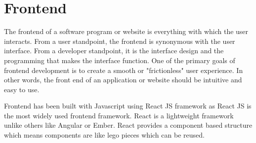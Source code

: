 

\section{Frontend}\label{sec:frontend}
The frontend of a software program or website is everything with which the user interacts.
From a user standpoint, the frontend is synonymous with the user interface.
From a developer standpoint, it is the interface design and the programming that makes the interface function.
One of the primary goals of frontend development is to create a smooth or "frictionless" user experience.
In other words, the front end of an application or website should be intuitive and easy to use.

Frontend has been built with Javascript using React JS framework as React JS is the most widely used frontend framework.
React is a lightweight framework unlike others like Angular or Ember.
React provides a component based structure which means components are like lego pieces which can be reused.

